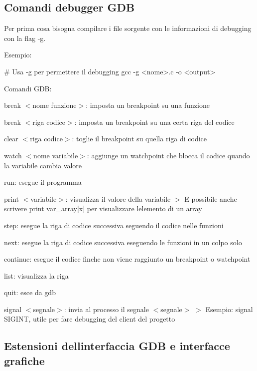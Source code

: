 \subsection*{Comandi debugger G\+DB}

Per prima cosa bisogna compilare i file sorgente con le informazioni di debugging con la flag {\ttfamily -\/g}.

Esempio\+: 
\begin{DoxyCode}
# Usa -g per permettere il debugging
gcc -g <nome>.c -o <output>
\end{DoxyCode}


Comandi G\+DB\+:
\begin{DoxyItemize}
\item {\ttfamily break $<$nome funzione$>$}\+: imposta un breakpoint su una funzione
\item {\ttfamily break $<$riga codice$>$}\+: imposta un breakpoint su una certa riga del codice
\item {\ttfamily clear $<$riga codice$>$}\+: toglie il breakpoint su quella riga di codice
\item {\ttfamily watch $<$nome variabile$>$}\+: aggiunge un watchpoint che blocca il codice quando la variabile cambia valore
\item {\ttfamily run}\+: esegue il programma
\item {\ttfamily print $<$variabile$>$}\+: visualizza il valore della variabile $>$ E\textquotesingle{} possibile anche scrivere print var\+\_\+array\mbox{[}x\mbox{]} per visualizzare l\textquotesingle{}elemento di un array
\item {\ttfamily step}\+: esegue la riga di codice successiva seguendo il codice nelle funzioni
\item {\ttfamily next}\+: esegue la riga di codice successiva eseguendo le funzioni in un colpo solo
\item {\ttfamily continue}\+: esegue il codice finche\textquotesingle{} non viene raggiunto un breakpoint o watchpoint
\item {\ttfamily list}\+: visualizza la riga
\item {\ttfamily quit}\+: esce da gdb
\item {\ttfamily signal $<$segnale$>$}\+: invia al processo il segnale {\ttfamily $<$segnale$>$} $>$ Esempio\+: {\ttfamily signal S\+I\+G\+I\+NT}, utile per fare debugging del client del progetto
\end{DoxyItemize}

\subsection*{Estensioni dell\textquotesingle{}interfaccia G\+DB e interfacce grafiche}

